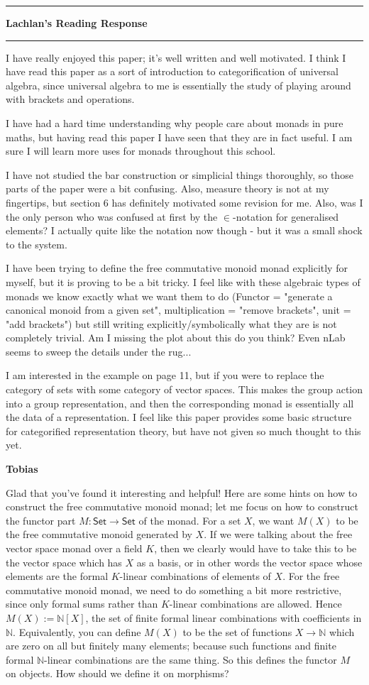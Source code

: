 \documentclass{amsart}
\newcommand{\iam}[1]{
  \vspace{0.25em}
  \hrule
  \vspace{0.25em}
  \textbf{{#1}'s Reading Response}
  \vspace{0.25em}
  \hrule
  \vspace{1em}
}
\newcommand{\respond}[1]{
  \vspace{1em} \textbf{#1}
}
\begin{document}
\iam{Lachlan}
I have really enjoyed this paper; it's well written and well motivated. I think I have read this paper as a sort of introduction to categorification of universal algebra, since universal algebra to me is essentially the study of playing around with brackets and operations.

I have had a hard time understanding why people care about monads in pure maths, but having read this paper I have seen that they are in fact useful. I am sure I will learn more uses for monads throughout this school.

I have not studied the bar construction or simplicial things thoroughly, so those parts of the paper were a bit confusing. Also, measure theory is not at my fingertips, but section 6 has definitely motivated some revision for me. Also, was I the only person who was confused at first by the $\in$-notation for generalised elements? I actually quite like the notation now though - but it was a small shock to the system.

I have been trying to define the free commutative monoid monad explicitly for myself, but it is proving to be a bit tricky. I feel like with these algebraic types of monads we know exactly what we want them to do (Functor = "generate a canonical monoid from a given set", multiplication = "remove brackets", unit = "add brackets") but still writing explicitly/symbolically what they are is not completely trivial. Am I missing the plot about this do you think? Even nLab seems to sweep the details under the rug...

I am interested in the example on page 11, but if you were to replace the category of sets with some category of vector spaces. This makes the group action into a group representation, and then the corresponding monad is essentially all the data of a representation. I feel like this paper provides some basic structure for categorified representation theory, but have not given so much thought to this yet.

\respond{Tobias}

Glad that you've found it interesting and helpful! Here are some hints on how to construct the free commutative monoid monad; let me focus on how to construct the functor part $M : \mathsf{Set} \to \mathsf{Set}$ of the monad. For a set $X$, we want $M(X)$ to be the free commutative monoid generated by $X$. If we were talking about the free vector space monad over a field $K$, then we clearly would have to take this to be the vector space which has $X$ as a basis, or in other words the vector space whose elements are the formal $K$-linear combinations of elements of $X$. For the free commutative monoid monad, we need to do something a bit more restrictive, since only formal sums rather than $K$-linear combinations are allowed. Hence $M(X) := \mathbb{N}[X]$, the set of finite formal linear combinations with coefficients in $\mathbb{N}$. Equivalently, you can define $M(X)$ to be the set of functions $X \to \mathbb{N}$ which are zero on all but finitely many elements; because such functions and finite formal $\mathbb{N}$-linear combinations are the same thing. So this defines the functor $M$ on objects. How should we define it on morphisms?
\end{document}
